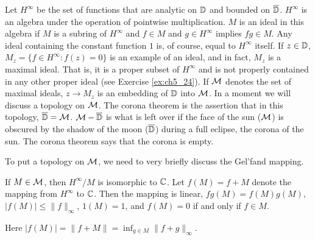 Let $H^\infty$ be the set of functions that are analytic on $\mathbb{D}$ and bounded on $\overline{\mathbb{D}}$. $H^\infty$ is an algebra under the operation of pointwise multiplication. $M$ is an ideal in this algebra if $M$ is a subring of $H^\infty$ and $f \in M$ and $g \in H^\infty$ implies $fg \in M$. Any ideal containing the constant function $1$ is, of course, equal to $H^\infty$ itself. If $z \in \mathbb{D}$, $M_z = \{f \in H^\infty : f(z) = 0\}$ is an example of an ideal, and in fact, $M_z$ is a maximal ideal. That is, it is a proper subset of $H^\infty$ and is not properly contained in any other proper ideal (see Exercise \ref{ex:ch5_24}). If $\mathcal{M}$ denotes the set of maximal ideals, $z \to M_z$ is an embedding of $\mathbb{D}$ into $\mathcal{M}$. In a moment we will discuss a topology on $\mathcal{M}$. The corona theorem is the assertion that in this topology, $\overline{\mathbb{D}} = \mathcal{M}$. $\mathcal{M} - \overline{\mathbb{D}}$ is what is left over if the face of the sun ($\mathcal{M}$) is obscured by the shadow of the moon ($\overline{\mathbb{D}}$) during a full eclipse, the corona of the sun. The corona theorem says that the corona is empty.

To put a topology on $\mathcal{M}$, we need to very briefly discuss the Gel'fand mapping.

\begin{proposition}\label{prop:ch5_6.1}
If $M \in \mathcal{M}$, then $H^\infty/M$ is isomorphic to $\mathbb{C}$. Let $f(M) = f + M$ denote the mapping from $H^\infty$ to $\mathbb{C}$. Then the mapping is linear, $fg(M) = f(M)g(M)$, $|f(M)| \leq \|f\|_\infty$, $1(M) = 1$, and $f(M) = 0$ if and only if $f \in M$.
\end{proposition}

Here $|f(M)| = \|f + M\| = \inf_{g\in M} \|f + g\|_\infty$.

